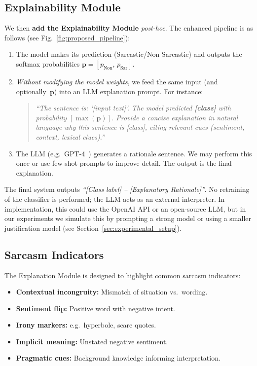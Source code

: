\subsection{Explainability Module}\label{subsec:explainability_module}

We then \textbf{add the Explainability Module} \emph{post-hoc}. The enhanced pipeline is as follows (see Fig.~\ref{fig:proposed_pipeline}):

\begin{enumerate}[label=\textbf{Step \arabic*:},leftmargin=*]
    \item The model makes its prediction (Sarcastic/Non-Sarcastic) and outputs the softmax probabilities $\mathbf{p} = [p_{\text{Non}},\, p_{\text{Sar}}]$.

    \item \emph{Without modifying the model weights}, we feed the same input (and optionally~$\mathbf{p}$) into an LLM explanation prompt. For instance:
    \begin{quote}
        \emph{``The sentence is: `[input text]'. The model predicted \textbf{[class]} with probability \textbf{$[\max(\mathbf{p})]$}. Provide a concise explanation in natural language why this sentence is [class], citing relevant cues (sentiment, context, lexical clues).''}
    \end{quote}

    \item The LLM (e.g.\ GPT-4~\cite{openai2023gpt4}) generates a rationale sentence. We may perform this once or use few-shot prompts to improve detail. The output is the final explanation.
\end{enumerate}

The final system outputs \emph{``[Class label] -- [Explanatory Rationale]''}. No retraining of the classifier is performed; the LLM acts as an external interpreter. In implementation, this could use the OpenAI API or an open-source LLM, but in our experiments we simulate this by prompting a strong model or using a smaller justification model (see Section~\ref{sec:experimental_setup}).

\subsection{Sarcasm Indicators}\label{subsec:sarcasm_indicators}

The Explanation Module is designed to highlight common sarcasm indicators:

\begin{itemize}[leftmargin=*]
    \item \textbf{Contextual incongruity:} Mismatch of situation vs.\ wording.
    \item \textbf{Sentiment flip:} Positive word with negative intent.
    \item \textbf{Irony markers:} e.g.\ hyperbole, scare quotes.
    \item \textbf{Implicit meaning:} Unstated negative sentiment.
    \item \textbf{Pragmatic cues:} Background knowledge informing interpretation.
\end{itemize}

